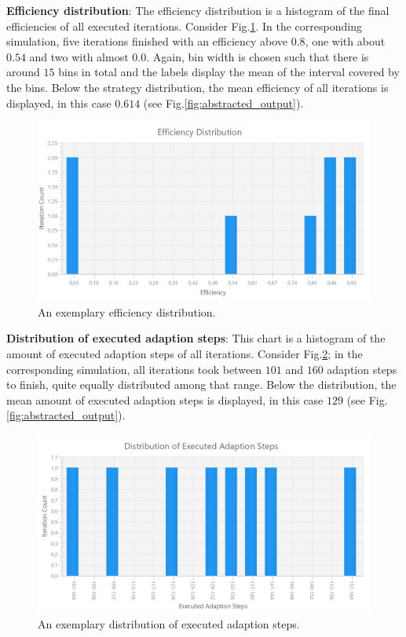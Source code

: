 \documentclass[parskip=full,11pt]{scrartcl}
\newcommand*\circled[1]{\tikz[baseline=(char.base)]{
            \node[shape=circle,draw,inner sep=2pt] (char) {#1};}}
\begin{document}
\textbf{Efficiency distribution}: The efficiency distribution \circled{2} is a histogram of the final efficiencies of all executed iterations. Consider Fig.\ref{fig:efficiency_distribution}. In the corresponding simulation, five iterations finished with an efficiency above \(0.8\), one with about \(0.54\) and two with almost \(0.0\). Again, bin width is chosen such that there is around \(15\) bins in total and the labels display the mean of the interval covered by the bins. Below the strategy distribution, the mean efficiency of all iterations is displayed, in this case \(0.614\) (see Fig.\ref{fig:abstracted_output}).

\begin{figure}[h]
	\centering
	\includegraphics[width=0.7\linewidth]{img_manual/efficiency_distribution.png}
	\caption{An exemplary efficiency distribution.}
	\label{fig:efficiency_distribution}
\end{figure}

\textbf{Distribution of executed adaption steps}: This chart \circled{3} is a histogram of the amount of executed adaption steps of all iterations. Consider Fig.\ref{fig:adapts_distribution}; in the corresponding simulation, all iterations took between \(101\) and \(160\) adaption steps to finish, quite equally distributed among that range. Below the distribution, the mean amount of executed adaption steps is displayed, in this case \(129\) (see Fig.\ref{fig:abstracted_output}).

\begin{figure}[h]
	\centering
	\includegraphics[width=0.7\linewidth]{img_manual/adapts_distribution.png}
	\caption{An exemplary distribution of executed adaption steps.}
	\label{fig:adapts_distribution}
\end{figure}
\end{document}
